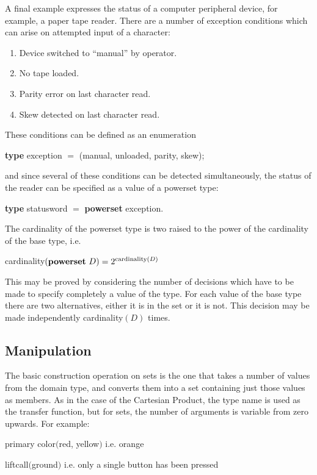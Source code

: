 A final example expresses the status of a computer peripheral device, for example, a paper tape reader. There are a number of exception conditions which can arise on attempted input of a character:

\begin{enumerate}[leftmargin=2\parindent, label=(\arabic*)]
	\item Device switched to ``manual'' by operator.
	\item No tape loaded.
	\item Parity error on last character read.
	\item Skew detected on last character read.
\end{enumerate}

\noindent
These conditions can be defined as an enumeration

\quad \textbf{type} exception $=$ (manual, unloaded, parity, skew); 

\noindent
and since several of these conditions can be detected simultaneously, the status of the reader can be specified as a value of a powerset type:

\quad \textbf{type} statusword $=$ \textbf{powerset} exception.

The cardinality of the powerset type is two raised to the power of the cardinality of the base type, i.e.

\quad cardinality$(\text{\textbf{powerset} } D) = 2^{\text{cardinality} (D)}$

This may be proved by considering the number of decisions which have to be made to specify completely a value of the type. For each value of the base type there are two alternatives, either it is in the set or it is not. This decision may be made independently cardinality$(D)$ times.

\subsection{Manipulation}

The basic construction operation on sets is the one that takes a number of values from the domain type, and converts them into a set containing just those values as members. As in the case of the Cartesian Product, the type name is used as the transfer function, but for sets, the number of arguments is variable from zero upwards. For example:

\quad primary color$($red, yellow$)$ \tabto*{14em} i.e. orange

\quad liftcall$($ground$)$ \tabto*{14em}  i.e. only a single button has been pressed

